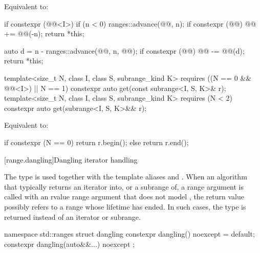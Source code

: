 \begin{itemdescr}
\pnum
\effects
Equivalent to:
\begin{codeblock}
if constexpr (@@<I>) {
  if (n < 0) {
    ranges::advance(@@, n);
    if constexpr (@@)
      @@ += @@(-n);
    return *this;
  }
}

auto d = n - ranges::advance(@@, n, @@);
if constexpr (@@)
  @@ -= @@(d);
return *this;
\end{codeblock}
\end{itemdescr}

%
\begin{itemdecl}
template<size_t N, class I, class S, subrange_kind K>
  requires ((N == 0 && @@<I>) || N == 1)
  constexpr auto get(const subrange<I, S, K>& r);
template<size_t N, class I, class S, subrange_kind K>
  requires (N < 2)
  constexpr auto get(subrange<I, S, K>&& r);
\end{itemdecl}

\begin{itemdescr}
\pnum
\effects
Equivalent to:
\begin{codeblock}
if constexpr (N == 0)
  return r.begin();
else
  return r.end();
\end{codeblock}
\end{itemdescr}

[range.dangling]{Dangling iterator handling}

\pnum
The type  is used together with the template aliases
 and .
When an algorithm
that typically returns an iterator into, or a subrange of, a range argument
is called with an rvalue range argument
that does not model ,
the return value possibly refers to a range whose lifetime has ended.
In such cases,
the type  is returned instead of an iterator or subrange.
%
\begin{codeblock}
namespace std::ranges {
  struct dangling {
    constexpr dangling() noexcept = default;
    constexpr dangling(auto&&...) noexcept {}
  };
}
\end{codeblock}

